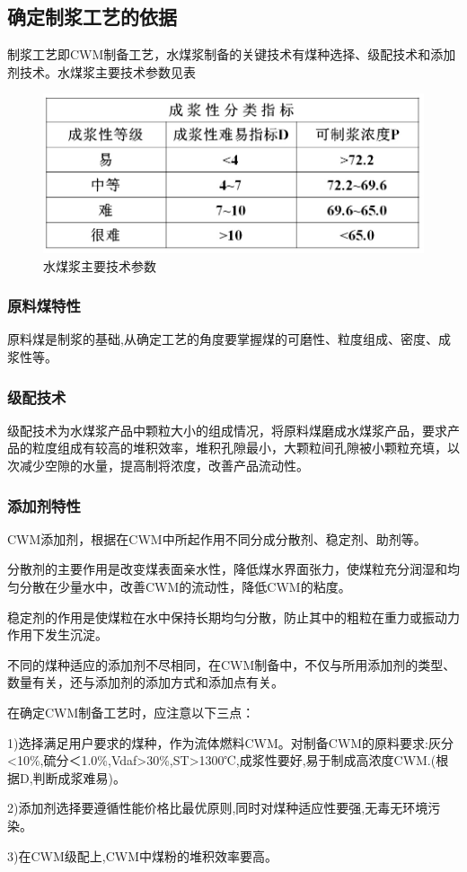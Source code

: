 \documentclass[10pt,openany]{ctexbook}
\begin{document}
 \subsection{确定制浆工艺的依据}
制浆工艺即CWM制备工艺，水煤浆制备的关键技术有煤种选择、级配技术和添加剂技术。水煤浆主要技术参数见表
     \begin{figure}[!ht]
\includegraphics[scale=0.6]{30}
\caption{水煤浆主要技术参数}
\end{figure}
\subsubsection{原料煤特性}
原料煤是制浆的基础,从确定工艺的角度要掌握煤的可磨性、粒度组成、密度、成浆性等。
\subsubsection{级配技术}
级配技术为水煤浆产品中颗粒大小的组成情况，将原料煤磨成水煤浆产品，要求产品的粒度组成有较高的堆积效率，堆积孔隙最小，大颗粒间孔隙被小颗粒充填，以次减少空隙的水量，提高制将浓度，改善产品流动性。
\subsubsection{添加剂特性}
CWM添加剂，根据在CWM中所起作用不同分成分散剂、稳定剂、助剂等。\par
分散剂的主要作用是改变煤表面亲水性，降低煤水界面张力，使煤粒充分润湿和均匀分散在少量水中，改善CWM的流动性，降低CWM的粘度。\par
    稳定剂的作用是使煤粒在水中保持长期均匀分散，防止其中的粗粒在重力或振动力作用下发生沉淀。\par
    不同的煤种适应的添加剂不尽相同，在CWM制备中，不仅与所用添加剂的类型、数量有关，还与添加剂的添加方式和添加点有关。\par
 在确定CWM制备工艺时，应注意以下三点：\par
 1)选择满足用户要求的煤种，作为流体燃料CWM。对制备CWM的原料要求:灰分<10\%,硫分＜1.0\%,Vdaf>30\%,ST>1300℃,成浆性要好,易于制成高浓度CWM.(根据D,判断成浆难易)。\par
    2)添加剂选择要遵循性能价格比最优原则,同时对煤种适应性要强,无毒无环境污染。\par
    3)在CWM级配上,CWM中煤粉的堆积效率要高。
\end{document}
